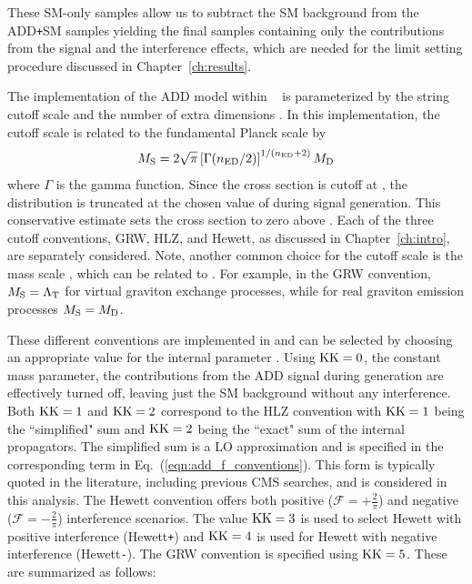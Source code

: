   These SM-only samples allow us to subtract the SM background from the ADD\texttt{+}SM samples yielding the final samples containing only the contributions from the signal and the interference effects, which are needed for the limit setting procedure discussed in Chapter~\ref{ch:results}. 

The implementation of the ADD model within \SHERPA~\cite{Gleisberg:2003ue} is parameterized by the string cutoff scale \Ms and the number of extra dimensions \nED. In this implementation, the cutoff scale \Ms is related to the fundamental Planck scale \MD by
\begin{equation}
	M_{\rm S} = 2\sqrt{\pi}\left[\Gamma(n_{\rm ED}/2)\right]^{1/(n_{\rm ED}+2)}{M_\mathrm{D}}
\end{equation}
\noindent where $\Gamma$ is the gamma function. Since the cross section is cutoff at \Ms, the \Mgg distribution is truncated at the chosen value of \Ms during signal generation. This conservative estimate sets the cross section to zero above \Mgg. Each of the three cutoff conventions, GRW, HLZ, and Hewett, as discussed in Chapter~\ref{ch:intro}, are separately considered. Note, another common choice for the cutoff scale is the mass scale \LambdaT, which can be related to \Ms. For example, in the GRW convention, $M_{\rm S} = \Lambda_{\rm T}$ for virtual graviton exchange processes, while for real graviton emission processes $M_{\rm S} = {M_\mathrm{D}}$.

These different conventions are implemented in \SHERPA and can be selected by choosing an appropriate value for the internal parameter \KK. Using $\mathrm{KK}=0$, the constant mass parameter, the contributions from the ADD signal during generation are effectively turned off, leaving just the SM background without any interference. Both $\mathrm{KK}=1$ and $\mathrm{KK}=2$ correspond to the HLZ convention with $\mathrm{KK}=1$ being the ``simplified" sum and $\mathrm{KK}=2$ being the ``exact" sum of the internal \KK propagators. The simplified sum is a LO approximation and is specified in the corresponding term in Eq.~(\ref{eqn:add_f_conventions}). This form is typically quoted in the literature, including previous CMS searches, and is considered in this analysis. The Hewett convention offers both positive ($\mathcal{F} = +\frac{2}{\pi}$) and negative ($\mathcal{F} = -\frac{2}{\pi}$) interference scenarios. The value $\mathrm{KK}=3$ is used to select Hewett with positive interference (Hewett\texttt{+}) and $\mathrm{KK}=4$ is used for Hewett with negative interference (Hewett\texttt{-}). The GRW convention is specified using $\mathrm{KK}=5$. These are summarized as follows:

